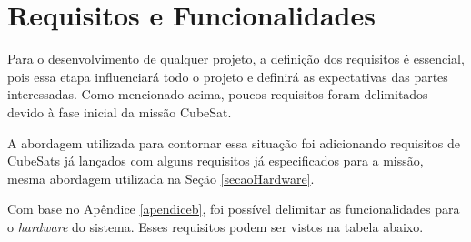 \section{Requisitos e Funcionalidades}

Para o desenvolvimento de qualquer projeto, a definição dos requisitos é essencial, pois essa etapa influenciará todo o projeto e definirá as expectativas das partes interessadas. Como mencionado acima, poucos requisitos foram delimitados devido à fase inicial da missão CubeSat.

A abordagem utilizada para contornar essa situação foi adicionando requisitos de CubeSats já lançados com alguns requisitos já especificados para a missão, mesma abordagem utilizada na Seção \ref{secaoHardware}.

Com base no Apêndice \ref{apendiceb}, foi possível delimitar as funcionalidades para o \textit{hardware} do sistema. Esses requisitos podem ser vistos na tabela abaixo.

